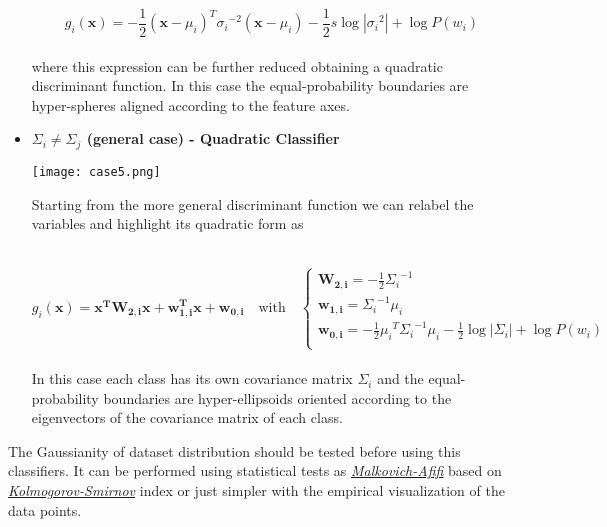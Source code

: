 \documentclass{standalone}
\begin{document}
\begin{itemize}
$$
g_i(\mathbf{x}) = -\frac{1}{2}(\mathbf{x}-\mu_i)^T{\sigma_i}^{-2}(\mathbf{x}-\mu_i) -\frac{1}{2}s\log\left|{\sigma_i}^2\right|+\log P(w_i)
$$
\\
where this expression can be further reduced obtaining a quadratic discriminant function.
In this case the equal-probability boundaries are hyper-spheres aligned according to the feature axes.


\item \textbf{$\Sigma_i \neq\Sigma_j$ (general case) - Quadratic Classifier}

\begin{minipage}{.30\textwidth}
\hspace{-.5cm}
\texttt{[image: case5.png]}
\end{minipage}%
\begin{minipage}{.70\textwidth}
Starting from the more general discriminant function we can relabel the variables and highlight its quadratic form as
\end{minipage}\\

$$
g_i(\mathbf{x}) = \mathbf{x^TW_{2,i}x}+\mathbf{w_{1,i}^Tx} + \mathbf{w_{0,i}} \quad \mbox{with}\quad \left\{\begin{array}{l} \mathbf{W_{2,i}}=-\frac{1}{2}{\Sigma_i}^{-1}\\ \mathbf{w_{1,i}}={\Sigma_i}^{-1}\mu_i \\ \mathbf{w_{0,i}}=-\frac{1}{2}{\mu_i}^T{\Sigma_i}^{-1}\mu_i-\frac{1}{2}\log\left|\Sigma_i\right|+\log P(w_i) \\ \end{array}\right.
$$
\\
In this case each class has its own covariance matrix $\Sigma_i$ and the equal-probability boundaries are hyper-ellipsoids oriented according to the eigenvectors of the covariance matrix of each class.

\end{itemize}

The Gaussianity of dataset distribution should be tested before using this classifiers.
It can be performed using statistical tests as \href{https://www.jstor.org/stable/2284163?seq=1#page_scan_tab_contents}{\emph{Malkovich-Afifi}} based on \href{https://en.wikipedia.org/wiki/Kolmogorov–Smirnov_test}{\emph{Kolmogorov-Smirnov}} index or just simpler with the empirical visualization of the data points.
\end{document}

